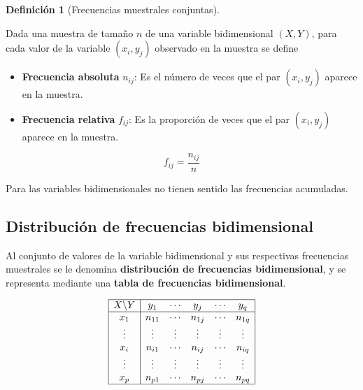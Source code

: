 \documentclass[
  spanish,
  a4paper,
]{scrreport}
\providecommand{\tightlist}{%
  \setlength{\itemsep}{0pt}\setlength{\parskip}{0pt}}
\theoremstyle{plain}
\theoremstyle{definition}
\theoremstyle{definition}
\newtheorem{definition}{Definición}[chapter]
\theoremstyle{remark}
\begin{document}
\begin{definition}[Frecuencias muestrales
conjuntas]\protect\hypertarget{def-frecuencias-muestrales-conjuntas}{}\label{def-frecuencias-muestrales-conjuntas}

Dada una muestra de tamaño \(n\) de una variable bidimensional
\((X,Y)\), para cada valor de la variable \((x_i,y_j)\) observado en la
muestra se define

\begin{itemize}
\tightlist
\item
  \textbf{Frecuencia absoluta} \(n_{ij}\): Es el número de veces que el
  par \((x_i,y_j)\) aparece en la muestra.
\item
  \textbf{Frecuencia relativa} \(f_{ij}\): Es la proporción de veces que
  el par \((x_i,y_j)\) aparece en la muestra.
\end{itemize}

\[f_{ij}=\frac{n_{ij}}{n}\]

\end{definition}

\begin{tcolorbox}[enhanced jigsaw, arc=.35mm, bottomrule=.15mm, bottomtitle=1mm, breakable, colback=white, colbacktitle=quarto-callout-warning-color!10!white, colframe=quarto-callout-warning-color-frame, coltitle=black, left=2mm, leftrule=.75mm, opacityback=0, opacitybacktitle=0.6, rightrule=.15mm, title=\textcolor{quarto-callout-warning-color}{\faExclamationTriangle}\hspace{0.5em}{Advertencia}, titlerule=0mm, toprule=.15mm, toptitle=1mm]

Para las variables bidimensionales no tienen sentido las frecuencias
acumuladas.

\end{tcolorbox}

\subsection{Distribución de frecuencias
bidimensional}\label{distribuciuxf3n-de-frecuencias-bidimensional}

Al conjunto de valores de la variable bidimensional y sus respectivas
frecuencias muestrales se le denomina \textbf{distribución de
frecuencias bidimensional}, y se representa mediante una \textbf{tabla
de frecuencias bidimensional}.

\[\begin{array}{|c|ccccc|}
\hline
X\backslash Y & y_1 & \cdots & y_j & \cdots & y_q\\
\hline
x_1 & n_{11} & \cdots & n_{1j} & \cdots & n_{1q}\\
\vdots & \vdots & \vdots & \vdots & \vdots & \vdots\\
x_i & n_{i1} & \cdots & n_{ij} & \cdots & n_{iq}\\
\vdots & \vdots & \vdots & \vdots & \vdots & \vdots\\
x_p & n_{p1} & \cdots & n_{pj} & \cdots & n_{pq}\\
\hline
\end{array}\]
\end{document}
